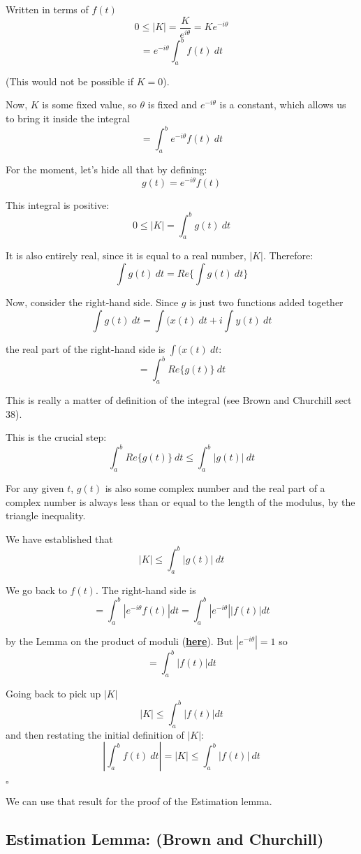 \documentclass[11pt, oneside]{article}
\begin{document}
Written in terms of $f(t)$
\[ 0 \le |K| = \frac{K}{e^{i \theta}}  = K e^{-i \theta} \]
\[ = e^{-i \theta} \int_a^b f(t) \ dt \]

(This would not be possible if $K = 0$).

Now, $K$ is some fixed value, so $ \theta$ is fixed and $e^{-i \theta}$ is a constant, which allows us to bring it inside the integral
\[ = \int_a^b e^{-i \theta} f(t) \ dt \]

For the moment, let's hide all that by defining: 
\[ g(t) = e^{-i \theta} f(t) \]

This integral is positive:
\[ 0 \le |K| = \int_a^b g(t) \ dt  \]

It is also entirely real, since it is equal to a real number, $|K|$.  Therefore:
\[ \int g(t) \ dt = Re \{ \int g(t) \ dt \} \]

Now, consider the right-hand side.  Since $g$ is just two functions added together
\[ \int g(t) \ dt = \int (x(t) \ dt + i \int y(t) \ dt \]

the real part of the right-hand side is $\int (x(t) \ dt$:
\[ = \int_a^b Re \{ g(t) \} \ dt \]

This is really a matter of definition of the integral (see Brown and Churchill sect 38).

This is the crucial step:
\[ \int_a^b Re \{ g(t)\} \ dt \le \int_a^b |g(t)| \ dt  \]

For any given $t$, $g(t)$ is also some complex number and the real part of a complex number is always less than or equal to the length of the modulus, by the triangle inequality.

We have established that 
\[ |K| \le \int_a^b |g(t)| \ dt \]

We go back to $f(t)$.  The right-hand side is
\[ = \int_a^b | e^{-i\theta} f(t) | dt = \int_a^b | e^{-i\theta} |  | f(t) | dt \]

by the Lemma on the product of moduli (\hyperref[sec:product_of_moduli]{\textbf{here}}). But $| e^{-i\theta} | = 1$ so
\[ = \int_a^b |f(t)| dt \]

Going back to pick up $|K|$
\[ |K| \le \int_a^b |f(t)| dt \]
and then restating the initial definition of $|K|$:
\[  | \int_a^b f(t) \ dt | = |K| \le \int_a^b |f(t)| \ dt \]

$\square$

We can use that result for the proof of the Estimation lemma.

\subsection*{Estimation Lemma:  (Brown and Churchill)}
\end{document}
